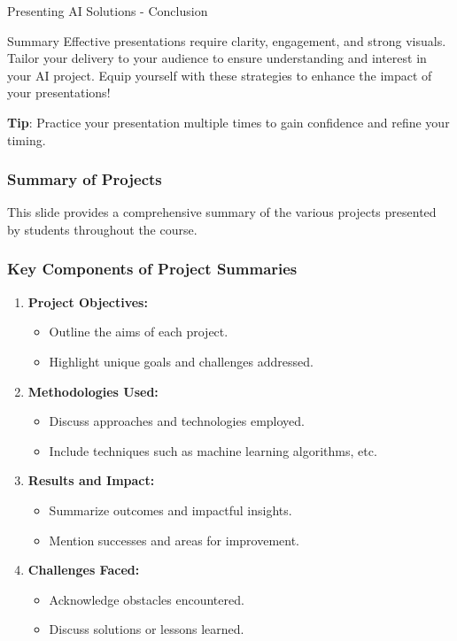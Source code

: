 \documentclass[aspectratio=169]{beamer}
\begin{document}
\begin{frame}[fragile]{Presenting AI Solutions - Conclusion}
    \begin{block}{Summary}
        Effective presentations require clarity, engagement, and strong visuals. Tailor your delivery to your audience to ensure understanding and interest in your AI project. Equip yourself with these strategies to enhance the impact of your presentations!
    \end{block}
    \textbf{Tip}: Practice your presentation multiple times to gain confidence and refine your timing.
\end{frame}

\begin{frame}[fragile]
    \frametitle{Summary of Projects}
    This slide provides a comprehensive summary of the various projects presented by students throughout the course.
\end{frame}

\begin{frame}[fragile]
    \frametitle{Key Components of Project Summaries}
    \begin{enumerate}
        \item \textbf{Project Objectives:} 
            \begin{itemize}
                \item Outline the aims of each project.
                \item Highlight unique goals and challenges addressed.
            \end{itemize}
        
        \item \textbf{Methodologies Used:} 
            \begin{itemize}
                \item Discuss approaches and technologies employed.
                \item Include techniques such as machine learning algorithms, etc.
            \end{itemize}
        
        \item \textbf{Results and Impact:} 
            \begin{itemize}
                \item Summarize outcomes and impactful insights.
                \item Mention successes and areas for improvement.
            \end{itemize}
        
        \item \textbf{Challenges Faced:} 
            \begin{itemize}
                \item Acknowledge obstacles encountered.
                \item Discuss solutions or lessons learned.
            \end{itemize}
    \end{enumerate}
\end{frame}
\end{document}

